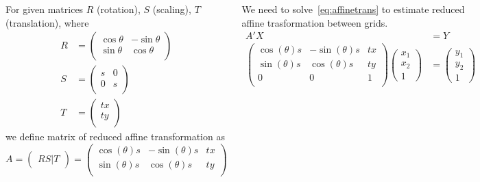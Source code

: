 \documentclass[17pt, a0paper, portrait]{tikzposter}
\begin{document}
\begin{columns}
{\begin{defn}
For given matrices $R$ (rotation), $S$ (scaling), $T$ (translation), where
\begin{align}
    R &=
    \begin{pmatrix}
        \cos{\theta} & -\sin{\theta} \\
        \sin{\theta} & \cos{\theta} \\
    \end{pmatrix} \\
    S &=
    \begin{pmatrix}
        s & 0 \\
        0 & s \\
    \end{pmatrix} \\
    T &=
    \begin{pmatrix}
        tx \\
        ty \\
    \end{pmatrix}
\end{align}
we define matrix of reduced affine transformation as
\begin{equation}
    A =
    \begin{pmatrix}
        RS|T
    \end{pmatrix}
    =
    \begin{pmatrix}
        \cos(\theta)s & -\sin(\theta)s & tx \\
        \sin(\theta)s & \cos(\theta)s & ty \\
    \end{pmatrix}
\end{equation}
\end{defn}

We need to solve~\eqref{eq:affinetrans} to estimate reduced affine trasformation between grids.
\begin{align}
    A'X &= Y \label{eq:affinetrans}\\
    \begin{pmatrix}
        \cos(\theta)s & -\sin(\theta)s & tx \\
        \sin(\theta)s & \cos(\theta)s & ty \\
        0 & 0 & 1 \\
    \end{pmatrix}
    \begin{pmatrix}
        x_1 \\
        x_2 \\
        1
    \end{pmatrix}
    &=
    \begin{pmatrix}
        y_1 \\
        y_2 \\
        1
    \end{pmatrix}
\end{align}


}
\end{columns}
\end{document}
